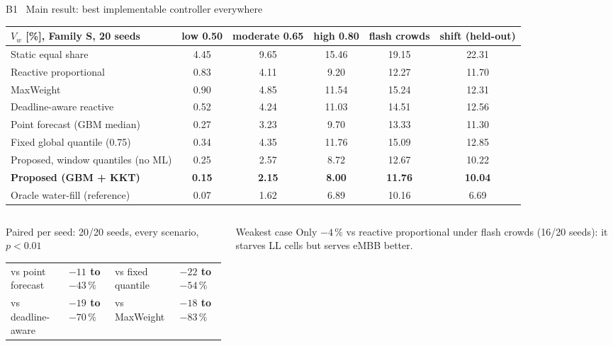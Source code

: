 \documentclass[aspectratio=169,10pt,xcolor={table,dvipsnames}]{beamer}
\newcommand{\gd}[1]{\textcolor{good}{\textbf{#1}}}
\newcommand{\ours}{\rowcolor{good!14}}
\newcommand{\gray}[1]{\textcolor{muted}{#1}}
\begin{document}
\begin{frame}{B1 \textbullet\ Main result: best implementable controller everywhere}
\centering
\scriptsize
\setlength{\tabcolsep}{4pt}
\begin{tabular}{lccccc}
\toprule
$V_w$ [\%], Family S, 20 seeds & low 0.50 & moderate 0.65 & high 0.80 & flash crowds & shift (held-out) \\
\midrule
Static equal share & 4.45 & 9.65 & 15.46 & 19.15 & 22.31 \\
Reactive proportional & 0.83 & 4.11 & 9.20 & 12.27 & 11.70 \\
MaxWeight & 0.90 & 4.85 & 11.54 & 15.24 & 12.31 \\
Deadline-aware reactive & 0.52 & 4.24 & 11.03 & 14.51 & 12.56 \\
Point forecast (GBM median) & 0.27 & 3.23 & 9.70 & 13.33 & 11.30 \\
Fixed global quantile (0.75) & 0.34 & 4.35 & 11.76 & 15.09 & 12.85 \\
Proposed, window quantiles (no ML) & 0.25 & 2.57 & 8.72 & 12.67 & 10.22 \\
\ours \textbf{Proposed (GBM + KKT)} & \textbf{0.15} & \textbf{2.15} & \textbf{8.00} & \textbf{11.76} & \textbf{10.04} \\
\midrule
\gray{Oracle water-fill (reference)} & \gray{0.07} & \gray{1.62} & \gray{6.89} & \gray{10.16} & \gray{6.69} \\
\bottomrule
\end{tabular}
\vspace{0.6em}
\begin{columns}[T]
\begin{column}{0.56\textwidth}
\begin{exampleblock}{Paired per seed: 20/20 seeds, every scenario, $p<0.01$}
\footnotesize\setlength{\tabcolsep}{3pt}
\begin{tabular}{@{}ll@{\hspace{8pt}}ll@{}}
vs point forecast & \gd{$-11$ to $-43\,\%$} & vs fixed quantile & \gd{$-22$ to $-54\,\%$}\\
vs deadline-aware & \gd{$-19$ to $-70\,\%$} & vs MaxWeight & \gd{$-18$ to $-83\,\%$}
\end{tabular}
\end{exampleblock}
\end{column}
\begin{column}{0.42\textwidth}
\begin{alertblock}{Weakest case}
\footnotesize Only $-4\,\%$ vs reactive proportional under flash crowds (16/20 seeds): it starves LL cells but serves eMBB better.
\end{alertblock}
\end{column}
\end{columns}
\end{frame}
\end{document}
